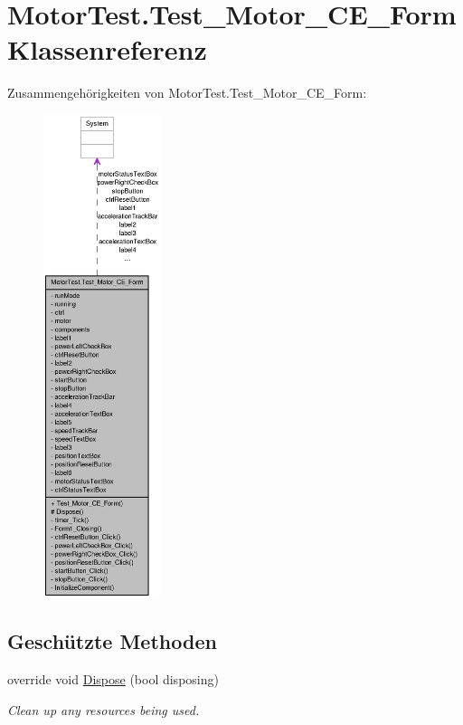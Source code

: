 \hypertarget{class_motor_test_1_1_test___motor___c_e___form}{
\section{MotorTest.Test\_\-Motor\_\-CE\_\-Form Klassenreferenz}
\label{class_motor_test_1_1_test___motor___c_e___form}
}


Zusammengehörigkeiten von MotorTest.Test\_\-Motor\_\-CE\_\-Form:\nopagebreak
\begin{figure}[H]
\begin{center}
\leavevmode
\includegraphics[height=400pt]{class_motor_test_1_1_test___motor___c_e___form__coll__graph}
\end{center}
\end{figure}
\subsection*{Geschützte Methoden}
\begin{DoxyCompactItemize}
\item 
override void \hyperlink{class_motor_test_1_1_test___motor___c_e___form_aed039c8b2c800c4acbd63f0c69955258}{Dispose} (bool disposing)
\begin{DoxyCompactList}\small\item\em Clean up any resources being used. \item\end{DoxyCompactList}\end{DoxyCompactItemize}


